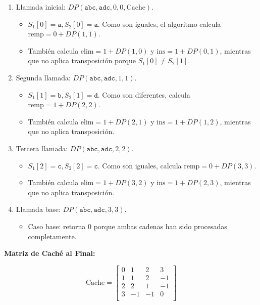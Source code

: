 \begin{enumerate}
    \item Llamada inicial: \( DP(\texttt{abc}, \texttt{adc}, 0, 0, \text{Cache}) \).
    \begin{itemize}
        \item \( S_1[0] = \texttt{a}, S_2[0] = \texttt{a} \). Como son iguales, el algoritmo calcula \( \text{remp} = 0 + DP(1, 1) \).
        \item También calcula \( \text{elim} = 1 + DP(1, 0) \) y \( \text{ins} = 1 + DP(0, 1) \), mientras que no aplica transposición porque \( S_1[0] \neq S_2[1] \).
    \end{itemize}

    \item Segunda llamada: \( DP(\texttt{abc}, \texttt{adc}, 1, 1) \).
    \begin{itemize}
        \item \( S_1[1] = \texttt{b}, S_2[1] = \texttt{d} \). Como son diferentes, calcula \( \text{remp} = 1 + DP(2, 2) \).
        \item También calcula \( \text{elim} = 1 + DP(2, 1) \) y \( \text{ins} = 1 + DP(1, 2) \), mientras que no aplica transposición.
    \end{itemize}

    \item Tercera llamada: \( DP(\texttt{abc}, \texttt{adc}, 2, 2) \).
    \begin{itemize}
        \item \( S_1[2] = \texttt{c}, S_2[2] = \texttt{c} \). Como son iguales, calcula \( \text{remp} = 0 + DP(3, 3) \).
        \item También calcula \( \text{elim} = 1 + DP(3, 2) \) y \( \text{ins} = 1 + DP(2, 3) \), mientras que no aplica transposición.
    \end{itemize}

    \item Llamada base: \( DP(\texttt{abc}, \texttt{adc}, 3, 3) \).
    \begin{itemize}
        \item Caso base: retorna 0 porque ambas cadenas han sido procesadas completamente.
    \end{itemize}
\end{enumerate}

\textbf{Matriz de Caché al Final: }

\[
\text{Cache} =
\begin{bmatrix}
0 & 1 & 2 & 3 \\
1 & 1 & 2 & -1 \\
2 & 2 & 1 & -1 \\
3 & -1 & -1 & 0 \\
\end{bmatrix}
\] \\

